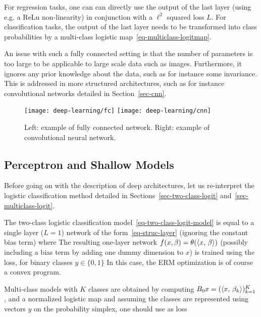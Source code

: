 For regression tasks, one can can directly use the output of the last layer (using e.g. a ReLu non-linearity) in conjunction with a $\ell^2$ squared loss $L$.
%
For classification tasks, the output of the last layer needs to be transformed into class probabilities by a multi-class logistic map~\eqref{eq-multiclass-logitmap}.

An issue with such a fully connected setting is that the number of parameters is too large to be applicable to large scale data such as images. Furthermore, it ignores any prior knowledge about the data, such as for instance some invariance. This is addressed in more structured architectures, such as for instance convolutional networks detailed in Section~\ref{sec-cnn}. 


\begin{figure}
\texttt{[image: deep-learning/fc]} \quad
\texttt{[image: deep-learning/cnn]}
\caption{\label{fig-bgd}
Left: example of fully connected network.
Right: example of convolutional neural network.
}
\end{figure}

\subsection{Perceptron and Shallow Models}

Before going on with the description of deep architectures, let us re-interpret the logistic classification method detailed in Sections~\ref{sec-two-class-logit} and~\ref{sec-multiclass-logit}.

The two-class logistic classification model~\eqref{eq-two-class-logit-model} is equal to a single layer ($L=1$) network of the form~\eqref{eq-struc-layer} (ignoring the constant bias term) where 
The resulting one-layer network $f(x,\beta) = \theta(\langle x,\,\beta\rangle)$ (possibly including a bias term by adding one dummy dimension to $x$) is trained using the loss, for binary classes $y \in \{0,1\}$ 
In this case, the ERM optimization is of course a convex program. 

Multi-class models with $K$ classes are obtained by computing $B_0 x = (\langle x,\,\beta_k\rangle)_{k=1}^K$, and a normalized logistic map 
and assuming the classes are represented using vectors $y$ on the probability simplex, one should use as loss

